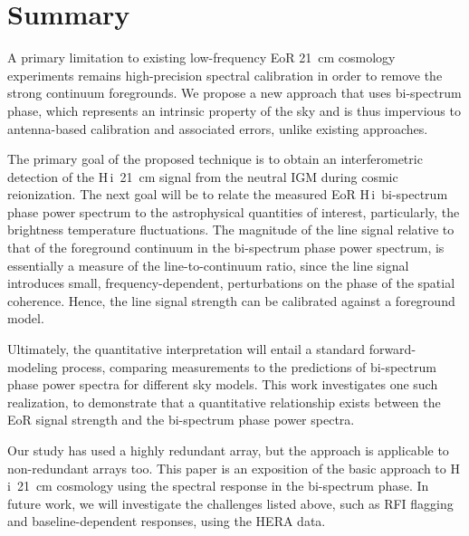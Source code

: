 \documentclass[
reprint,
superscriptaddress,
amsmath,
amssymb,
aps,
prd
]{revtex4-1}
\newcommand{\HI}{H\,{\sc i}}
\begin{document}
\section{Summary}\label{sec:summary}

A primary limitation to existing low-frequency EoR 21~cm cosmology experiments remains high-precision spectral calibration in order to remove the strong continuum foregrounds. We propose a new approach that uses bi-spectrum phase, which represents an intrinsic property of the sky and is thus impervious to antenna-based calibration and associated errors, unlike existing approaches.
  
The primary goal of the proposed technique is to obtain an interferometric detection of the \HI\ 21~cm signal from the neutral IGM during cosmic reionization. The next goal will be to relate the measured EoR \HI\ bi-spectrum phase power spectrum to the astrophysical quantities of interest, particularly, the brightness temperature fluctuations. The magnitude of the line signal relative to that of the foreground continuum in the bi-spectrum phase power spectrum, is essentially a measure of the line-to-continuum ratio, since the line signal introduces small, frequency-dependent, perturbations on the phase of the spatial coherence. Hence, the line signal strength can be calibrated against a foreground model.

Ultimately, the quantitative interpretation will entail a standard forward-modeling process, comparing measurements to the predictions of bi-spectrum phase power spectra for different sky models. This work investigates one such realization, to demonstrate that a quantitative relationship exists between the EoR signal strength and the bi-spectrum phase power spectra.

Our study has used a highly redundant array, but the approach is applicable to non-redundant arrays too. This paper is an exposition of the basic approach to \HI\ 21~cm cosmology using the spectral response in the bi-spectrum phase. In future work, we will investigate the challenges listed above, such as RFI flagging and baseline-dependent responses, using the HERA data.

\end{document}
